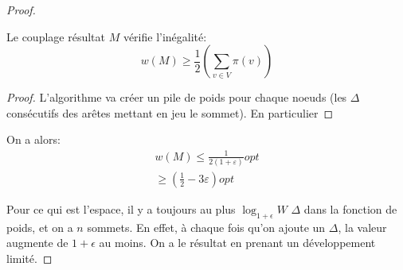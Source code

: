 \documentclass[math, info]{cours}
\begin{document}
\begin{proof}
\begin{lemme}
	Le couplage résultat $M$ vérifie l'inégalité:
	\begin{equation*}
		w(M) \geq \frac{1}{2}\left(\sum_{v\in V}\pi(v) \right)
	\end{equation*}
\end{lemme}
\begin{proof}
	L'algorithme va créer un pile de poids pour chaque noeuds (les $\Delta$ consécutifs des arêtes mettant en jeu le sommet).
	En particulier
\end{proof}

On a alors:
\begin{align*}
	w(M) \leq \frac{1}{2(1+\varepsilon)}opt\\
	\geq \left(\frac{1}{2} - 3\varepsilon \right)opt
\end{align*}

\medskip

Pour ce qui est l'espace, il y a toujours au plus $\log_{1 + \epsilon}W$ $\Delta$ dans la fonction de poids, et on a $n$ sommets.
En effet, à chaque fois qu'on ajoute un $\Delta$, la valeur augmente de $1 + \epsilon$ au moins.
On a le résultat en prenant un développement limité.
\end{proof}
\end{document}
